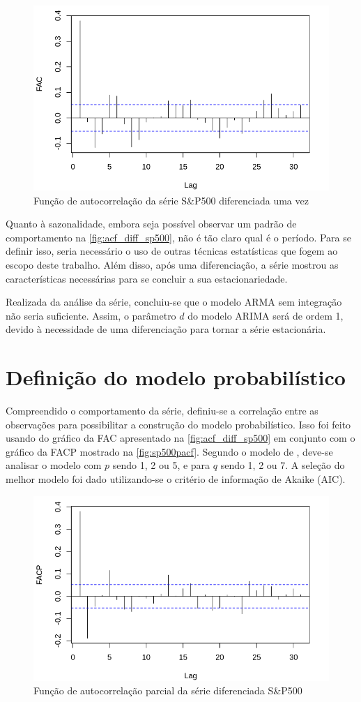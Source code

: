 \documentclass[
    12pt,
    oneside,
    a4paper,
    english,
    brazil
]{abntex2}
\begin{document}
\begin{figure}[ht]
    \centering
    \caption{Função de autocorrelação da série S\&P500 diferenciada uma vez}\label{fig:acf_diff_sp500}
    \includegraphics[width=.5\linewidth]{images/SP500_diff_FAC.png}
\end{figure}

Quanto à sazonalidade, embora seja possível observar um padrão de comportamento
na \autoref{fig:acf_diff_sp500},  não é  tão claro  qual é  o período.  Para se
definir isso, seria necessário o uso  de outras técnicas estatísticas que fogem
ao escopo deste  trabalho. Além disso, após uma diferenciação,  a série mostrou
as características necessárias para se concluir a sua estacionariedade.

Realizada da análise da série, concluiu-se que o modelo ARMA sem integração não
seria  suficiente. Assim,  o parâmetro  $d$ do  modelo ARIMA  será de  ordem 1,
devido à necessidade de uma diferenciação para tornar a série estacionária.

\section{Definição do modelo probabilístico}

Compreendido  o  comportamento  da  série, definiu-se  a  correlação  entre  as
observações para possibilitar  a construção do modelo  probabilístico. Isso foi
feito usando do  gráfico da FAC apresentado  na \autoref{fig:acf_diff_sp500} em
conjunto com o  gráfico da FACP mostrado na  \autoref{fig:sp500pacf}. Segundo o
modelo de , deve-se analisar o modelo  com $p$ sendo 1, 2 ou 5,
e para $q$ sendo 1, 2 ou 7. A seleção do melhor modelo foi dado utilizando-se o
critério de informação de Akaike (AIC).

\begin{figure}[ht]
    \centering
    \caption{Função de autocorrelação parcial da série diferenciada S\&P500}\label{fig:sp500pacf}
    \includegraphics[width=.5\linewidth]{images/SP500_diff_FACP.png}
\end{figure}
\end{document}
